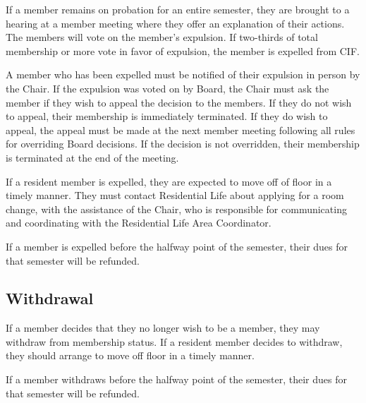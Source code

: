 If a member remains on probation for an entire semester, they are brought to a hearing at a member meeting where they offer an explanation of their actions. The members will vote on the member's expulsion. If two-thirds of total membership or more vote in favor of expulsion, the member is expelled from CIF.

A member who has been expelled must be notified of their expulsion in person by the Chair. If the expulsion was voted on by Board, the Chair must ask the member if they wish to appeal the decision to the members. If they do not wish to appeal, their membership is immediately terminated. If they do wish to appeal, the appeal must be made at the next member meeting following all rules for overriding Board decisions. If the decision is not overridden, their membership is terminated at the end of the meeting.

If a resident member is expelled, they are expected to move off of floor in a timely manner. They must contact Residential Life about applying for a room change, with the assistance of the Chair, who is responsible for communicating and coordinating with the Residential Life Area Coordinator.

If a member is expelled before the halfway point of the semester, their dues for that semester will be refunded.



	\subsection {Withdrawal}

If a member decides that they no longer wish to be a member, they may withdraw from membership status. If a resident member decides to withdraw, they should arrange to move off floor in a timely manner.

If a member withdraws before the halfway point of the semester, their dues for that semester will be refunded.
